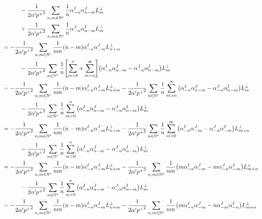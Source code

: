 \begin{align*}
    &\quad\quad\quad-\frac{1}{2\alpha'{p^+}^2}\sum\limits_{n,m\in\mathbb N^\ast}\frac{1}{n}\alpha_{-n}^I\alpha^J_{n-m}L^\perp_m\\
    &\quad\quad\quad+\frac{1}{2\alpha'{p^+}^2}\sum\limits_{n,m\in\mathbb N^\ast}\frac{1}{n}\alpha^J_{-n}\alpha^I_{n-m}L^\perp_m\\
    &=-\frac{1}{2\alpha'{p^+}^2}\sum\limits_{n,m\in\mathbb N^\ast}\frac{1}{nm}\qty(n-m)\alpha_{-n}^I\alpha^J_{-m}L^\perp_{n+m}\\
    &\quad\quad\quad-\frac{1}{2\alpha'{p^+}^2}\sum\limits_{n\in\mathbb N^\ast}\frac{1}{n}\qty[\sum\limits_{m>0}^n+\sum\limits_{m>n}^\infty]\qty(\alpha_{-n}^I\alpha^J_{n-m}-\alpha_{-n}^J\alpha^I_{n-m})L^\perp_m\\
    &=-\frac{1}{2\alpha'{p^+}^2}\sum\limits_{n,m\in\mathbb N^\ast}\frac{1}{nm}\qty(n-m)\alpha_{-n}^I\alpha^J_{-m}L^\perp_{n+m}-\frac{1}{2\alpha'{p^+}^2}\sum\limits_{n\in\mathbb N^\ast}\frac{1}{n}\sum\limits_{m>n}^\infty\qty(\alpha_{-n}^I\alpha^J_{n-m}-\alpha_{-n}^J\alpha^I_{n-m})L^\perp_m\\
    &\quad\quad\quad-\frac{1}{2\alpha'{p^+}^2}\sum\limits_{n\in\mathbb N^\ast}\frac{1}{n}\sum\limits_{m>0}^n\qty(\alpha_{-n}^I\alpha^J_{n-m}-\alpha_{-n}^J\alpha^I_{n-m})L^\perp_m\\
    &=-\frac{1}{2\alpha'{p^+}^2}\sum\limits_{n,m\in\mathbb N^\ast}\frac{1}{nm}\qty(n-m)\alpha_{-n}^I\alpha^J_{-m}L^\perp_{n+m}-\frac{1}{2\alpha'{p^+}^2}\sum\limits_{n\in\mathbb N^\ast}\frac{1}{n}\sum\limits_{m>0}^\infty\qty(\alpha_{-n}^I\alpha^J_{-m}-\alpha_{-n}^J\alpha^I_{-m})L^\perp_{m+n}\\
    &\quad\quad\quad-\frac{1}{2\alpha'{p^+}^2}\sum\limits_{n\in\mathbb N^\ast}\frac{1}{n}\sum\limits_{m>0}^n\qty(\alpha_{-n}^I\alpha^J_{n-m}-\alpha_{-n}^J\alpha^I_{n-m})L^\perp_m\\
    &=-\frac{1}{2\alpha'{p^+}^2}\sum\limits_{n,m\in\mathbb N^\ast}\frac{1}{nm}\qty(n-m)\alpha_{-n}^I\alpha^J_{-m}L^\perp_{n+m}-\frac{1}{2\alpha'{p^+}^2}\sum\limits_{n,m\in\mathbb N^\ast}\frac{1}{nm}\qty(m\alpha_{-n}^I\alpha^J_{-m}-m\alpha_{-n}^J\alpha^I_{-m})L^\perp_{m+n}\\
    &\quad\quad\quad-\frac{1}{2\alpha'{p^+}^2}\sum\limits_{n\in\mathbb N^\ast}\frac{1}{n}\sum\limits_{m>0}^n\qty(\alpha_{-n}^I\alpha^J_{n-m}-\alpha_{-n}^J\alpha^I_{n-m})L^\perp_m\\
    &=-\frac{1}{2\alpha'{p^+}^2}\sum\limits_{n,m\in\mathbb N^\ast}\frac{1}{nm}\qty(n-m)\alpha_{-n}^I\alpha^J_{-m}L^\perp_{n+m}-\frac{1}{2\alpha'{p^+}^2}\sum\limits_{n,m\in\mathbb N^\ast}\frac{1}{nm}\qty(m\alpha_{-n}^I\alpha^J_{-m}-n\alpha_{-m}^J\alpha^I_{-n})L^\perp_{m+n}\\

\end{align*}
